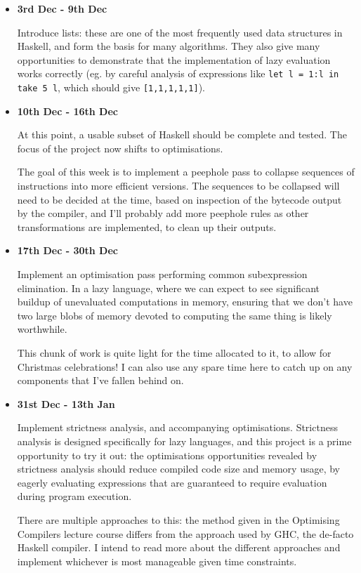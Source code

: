 \documentclass[12pt]{article}
\newcommand\haskell[1]{\texttt{#1}}
\begin{document}
\begin{itemize}
{}
\item
{
    \textbf{3rd Dec - 9th Dec}

    Introduce lists: these are one of the most frequently used data structures in Haskell, and form the basis for many
    algorithms. They also give many opportunities to demonstrate that the implementation of lazy evaluation works
    correctly (eg. by careful analysis of expressions like \haskell{let l = 1:l in take 5 l}, which should give
    \haskell{[1,1,1,1,1]}).

}
\item
{
    \textbf{10th Dec - 16th Dec}

    At this point, a usable subset of Haskell should be complete and tested. The focus of the project now shifts to
    optimisations.

    The goal of this week is to implement a peephole pass to collapse sequences of instructions into more efficient
    versions. The sequences to be collapsed will need to be decided at the time, based on inspection of the bytecode
    output by the compiler, and I'll probably add more peephole rules as other transformations are implemented, to clean
    up their outputs.

}
\item
{
    \textbf{17th Dec - 30th Dec}

    Implement an optimisation pass performing common subexpression elimination. In a lazy language, where we can expect
    to see significant buildup of unevaluated computations in memory, ensuring that we don't have two large blobs of
    memory devoted to computing the same thing is likely worthwhile.

    This chunk of work is quite light for the time allocated to it, to allow for Christmas celebrations! I can also use
    any spare time here to catch up on any components that I've fallen behind on.

}
\item
{
    \textbf{31st Dec - 13th Jan}

    Implement strictness analysis, and accompanying optimisations. Strictness analysis is designed specifically for lazy
    languages, and this project is a prime opportunity to try it out: the optimisations opportunities revealed by
    strictness analysis should reduce compiled code size and memory usage, by eagerly evaluating expressions that are
    guaranteed to require evaluation during program execution.

    There are multiple approaches to this: the method given in the Optimising Compilers lecture course differs from the
    approach used by GHC, the de-facto Haskell compiler. I intend to read more about the different approaches and
    implement whichever is most manageable given time constraints.

}
\end{itemize}
\end{document}
